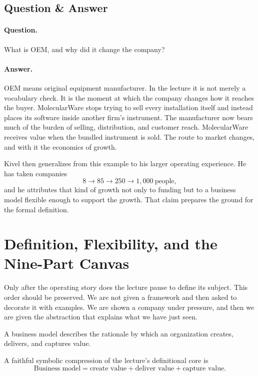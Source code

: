 \subsection{Question \& Answer}

\paragraph{Question.} What is OEM, and why did it change the company?

\paragraph{Answer.} OEM means original equipment manufacturer. In the lecture it is not merely a vocabulary check. It is the moment at which the company changes how it reaches the buyer. MolecularWare stops trying to sell every installation itself and instead places its software inside another firm's instrument. The manufacturer now bears much of the burden of selling, distribution, and customer reach. MolecularWare receives value when the bundled instrument is sold. The route to market changes, and with it the economics of growth.

Kivel then generalizes from this example to his larger operating experience. He has taken companies
\begin{equation}
8 \to 85 \to 250 \to 1{,}000 \ \text{people},
\end{equation}
and he attributes that kind of growth not only to funding but to a business model flexible enough to support the growth. That claim prepares the ground for the formal definition.

\section{Definition, Flexibility, and the Nine-Part Canvas}

Only after the operating story does the lecture pause to define its subject. This order should be preserved. We are not given a framework and then asked to decorate it with examples. We are shown a company under pressure, and then we are given the abstraction that explains what we have just seen.

\begin{definition}
A business model describes the rationale by which an organization creates, delivers, and captures value.
\end{definition}

A faithful symbolic compression of the lecture's definitional core is
\begin{equation}
\text{Business model}=\text{create value}+\text{deliver value}+\text{capture value}.
\end{equation}

